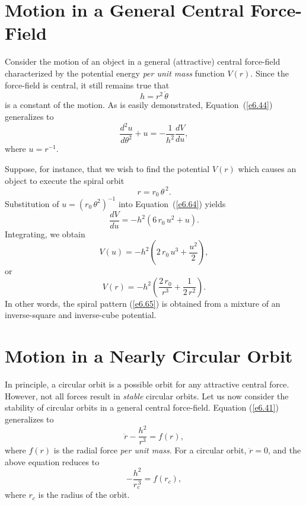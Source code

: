 \section{Motion in  a General Central Force-Field}
Consider the motion of an object in a general (attractive) central force-field characterized by the potential energy {\em per unit mass}\/ function $V(r)$. Since the force-field
is central, it still remains true that
\begin{equation}\label{6.63}
h = r^2\,\dot{\theta}
\end{equation}
is a constant of the motion. As is easily demonstrated, Equation~(\ref{e6.44})
generalizes to 
\begin{equation}\label{e6.64}
\frac{d^2 u}{d\theta^2} + u = - \frac{1}{h^2}\frac{dV}{du},
\end{equation}
where $u=r^{-1}$. 

Suppose, for instance, that we wish to find the potential $V(r)$ which causes
an object to execute the spiral orbit
\begin{equation}\label{e6.65}
r = r_0\,\theta^{\,2}.
\end{equation}
Substitution of $u = (r_0\,\theta^2)^{-1}$ into Equation~(\ref{e6.64}) yields
\begin{equation}
\frac{d V}{du} = - h^2\left(6\,r_0\,u^2 + u\right).
\end{equation}
Integrating, we obtain
\begin{equation}
V(u) = -h^2\left(2\,r_0\,u^3 + \frac{u^2}{2}\right),
\end{equation}
or
\begin{equation}
V(r) = - h^2\left(\frac{2\,r_0}{r^3} + \frac{1}{2\,r^2}\right).
\end{equation}
In other words, the spiral pattern (\ref{e6.65}) is obtained from a mixture
of an inverse-square and inverse-cube potential.

\section{Motion in a Nearly Circular Orbit}
In principle, a circular orbit is a possible orbit for any attractive central force.
However, not all forces result in {\em stable}\/ circular orbits.
Let us now consider the stability of circular orbits in a general central force-field. Equation (\ref{e6.41}) generalizes to
\begin{equation}\label{e6.69}
\ddot{r} - \frac{h^2}{r^3} = f(r),
\end{equation}
where $f(r)$ is the radial force {\em per unit mass}. For a circular orbit,
$\ddot{r}=0$, and the above equation reduces to
\begin{equation}\label{e6.70}
-\frac{h^2}{r_c^{\,3}} = f(r_c),
\end{equation}
where $r_c$ is the radius of the orbit. 

